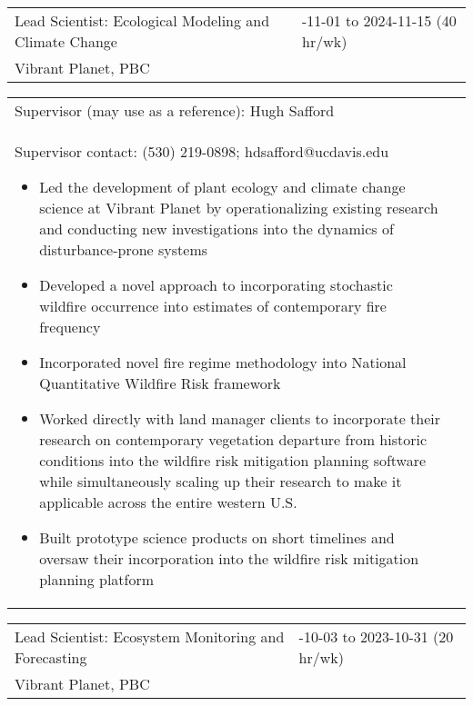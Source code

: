 \documentclass[10pt,english]{article}
\providecommand{\tabularnewline}{\\}
\begin{document}
\renewcommand{\arraystretch}{1.2}
\begin{tabularx}{\textwidth}{@{}>{\raggedright}p{3.75in} >{\raggedleft}X@{}}
Lead Scientist: Ecological Modeling and Climate Change & 2023-11-01 to 2024-11-15 (40 hr/wk) \tabularnewline
Vibrant Planet, PBC & \tabularnewline
\end{tabularx}

\renewcommand{\arraystretch}{1.2}
\begin{tabularx}{\textwidth}{@{}>{\raggedright}p{6.25in} >{\raggedleft}X@{}}
\addtolength{\leftskip}{5ex}Supervisor (may use as a reference): Hugh Safford \tabularnewline
\addtolength{\leftskip}{5ex}Supervisor contact: (530) 219-0898; hdsafford@ucdavis.edu
\begin{itemize}
\itemsep0em
\item{Led the development of plant ecology and climate change science at Vibrant Planet by operationalizing existing research and conducting new investigations into the dynamics of disturbance-prone systems}
\item{Developed a novel approach to incorporating stochastic wildfire occurrence into estimates of contemporary fire frequency}
\item{Incorporated novel fire regime methodology into National Quantitative Wildfire Risk framework}
\item{Worked directly with land manager clients to incorporate their research on contemporary vegetation departure from historic conditions into the wildfire risk mitigation planning software while simultaneously scaling up their research to make it applicable across the entire western U.S.}
\item{Built prototype science products on short timelines and oversaw their incorporation into the wildfire risk mitigation planning platform}
\end{itemize}
\end{tabularx}

\newpage

\renewcommand{\arraystretch}{1.2}
\begin{tabularx}{\textwidth}{@{}>{\raggedright}p{3.75in} >{\raggedleft}X@{}}
Lead Scientist: Ecosystem Monitoring and Forecasting & 2022-10-03 to 2023-10-31 (20 hr/wk) \tabularnewline
Vibrant Planet, PBC & \tabularnewline
\end{tabularx}
\end{document}
